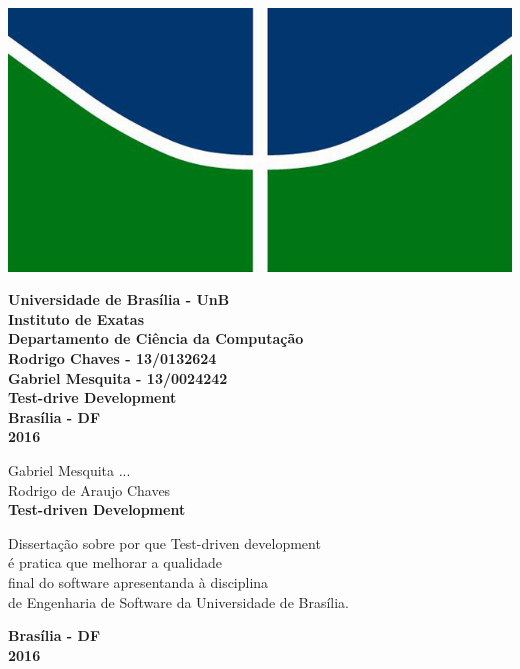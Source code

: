 \documentclass{article}
\begin{document}
    \begin{center}
    \includegraphics[scale=0.5]{unb}
    \par
    \vspace{15mm}
    \textbf{Universidade de Brasília - UnB}\\
    \textbf{Instituto de Exatas}\\
    \textbf{Departamento de Ciência da Computação}\\
    \vspace{15mm}
    \textbf{Rodrigo Chaves - 13/0132624}\\
    \textbf{Gabriel Mesquita - 13/0024242}\\
    \vspace{15mm}
    \textbf{Test-drive Development}\\
    \vspace{100mm}
    \textbf{Brasília - DF}\\
    \textbf{2016}
  \end{center}

  \clearpage

  \begin{center}
    Gabriel Mesquita ...\\
    Rodrigo de Araujo Chaves\\
    \vspace{30mm}
    \textbf{Test-driven Development}
    \vspace{30mm}
    \begin{flushright}
      Dissertação sobre por que Test-driven development\\
      é pratica que melhorar a qualidade\\
      final do software apresentanda à disciplina\\
      de Engenharia de Software da Universidade de Brasília.\\
    \end{flushright}
    \vspace{150mm}
    \textbf{Brasília - DF}\\
    \textbf{2016}
  \end{center}
\end{document}
